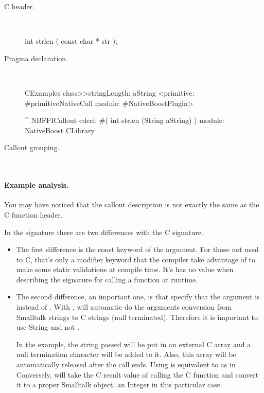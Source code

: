\documentclass[a4paper,10pt,twoside]{book}
\begin{document}
\begin{description}
\item [C header.] \ 

\begin{code}{}
int strlen ( const char * str );
\end{code}

\item [Pragma declaration.] \ 

\begin{code}{}
CExamples class>>stringLength: aString
	<primitive: #primitiveNativeCall module: #NativeBoostPlugin>
	
	^ NBFFICallout cdecl: #( int strlen (String aString) ) module: NativeBoost CLibrary
\end{code}


\item [Callout grouping.] \ 
 
\end{description}


\paragraph{Example analysis.} You may have noticed that the callout description is not exactly the same as the C function header. 

In the signature  there are two differences with the C signature. 
\begin{itemize}
\item  The first difference is the const keyword of the argument. For those not used to C, 
that's only a modifier keyword that the compiler take advantage of to make some static validations at compile time. It's has no
value when describing the signature for calling a function at
runtime.

\item The second difference, an important one, is that specify that the argument is  instead of . 
With , \Spock will automatic do the arguments conversion from Smalltalk strings to C strings (null terminated).
Therefore it is important to use String and not . 

In the example, the string passed will be put in an external C  array and a null termination character will be added to it. 
Also, this array will be automatically released after the call ends. Using  is equivalent to  as in . Conversely, \Spock
will take the C result value of calling the C function and convert it to a proper Smalltalk object, an Integer in this particular case.
\end{itemize}
\end{document}

